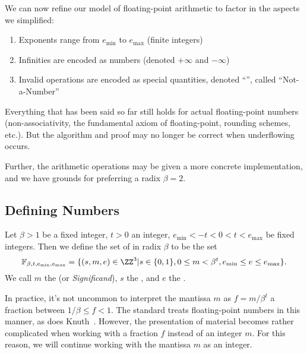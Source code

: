 We can now refine our model of floating-point arithmetic to factor in
the aspects we simplified:
\begin{enumerate}
\item Exponents range from $e_{\text{min}}$ to $e_{\text{max}}$ (finite integers)
\item Infinities are encoded as numbers (denoted $+\infty$ and $-\infty$)
\item Invalid operations are encoded as special quantities, denoted
  ``\NaN'', called ``Not-a-Number''
\end{enumerate}
Everything that has been said so far still holds for actual 
floating-point numbers (non-associativity, the fundamental axiom of
floating-point, rounding schemes, etc.). But the algorithm and proof may
no longer be correct when underflowing occurs.

Further, the arithmetic operations may be given a more concrete
implementation, and we have grounds for preferring a radix $\beta=2$.



\subsection{Defining Numbers}
\begin{defn}
  Let $\beta>1$ be a fixed integer, $t>0$ an integer,
  $e_{\text{min}}<-t<0<t<e_{\text{max}}$ be
  fixed integers. Then we define the set of 
  in radix $\beta$ to be the set
  \begin{equation}
    \mathbb{F}_{\beta,t,e_{\text{min}},e_{\text{max}}} = \{(s,m,e)\in\ZZ^{3}|
    s\in\{0,1\}, 0\leq m<\beta^{t}, e_{\text{min}}\leq e\leq e_{\text{max}}\}.
  \end{equation}
  We call $m$ the  (or \emph{Significand}), $s$ the
  , and $e$ the .
\end{defn}


\begin{danger}
  In practice, it's not uncommon to interpret the mantissa $m$ as
  $f=m/\beta^{t}$ a fraction between $1/\beta\leq f<1$. The 
  standard treats floating-point numbers in this manner, as does
  Knuth~\cite{taocp2}. However, the presentation of material becomes
  rather complicated when working with a fraction $f$ instead of an
  integer $m$. For this reason, we will continue working with the
  mantissa $m$ as an integer.
\end{danger}


